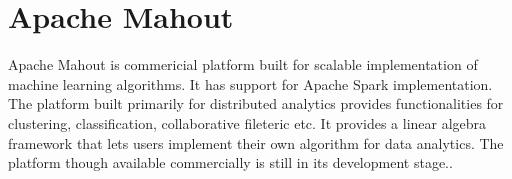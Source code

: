 \section{Apache Mahout}
Apache Mahout is commericial platform built for scalable implementation of
machine learning algorithms. It has support for Apache Spark implementation.
The platform built primarily for distributed analytics provides
functionalities for clustering, classification, collaborative fileteric etc.
It provides a linear algebra framework that lets users implement their own
algorithm for data analytics. The platform though available commercially is
still in its development stage.\cite{hid-sp18-411-apachemahout}.
